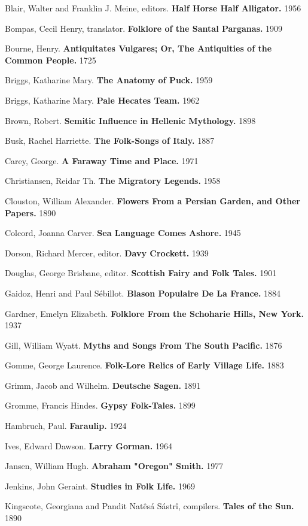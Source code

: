 \documentclass[14pt,a4paper]{memoir}
\begin{document}
Blair, Walter and Franklin J. Meine, editors. \textbf{Half Horse Half
Alligator.} 1956

Bompas, Cecil Henry, translator. \textbf{Folklore of the Santal
Parganas.} 1909

Bourne, Henry. \textbf{Antiquitates Vulgares; Or, The Antiquities of the
Common People.} 1725

Briggs, Katharine Mary. \textbf{The Anatomy of Puck.} 1959

Briggs, Katharine Mary. \textbf{Pale Hecate\textquotesingle s Team.}
1962

Brown, Robert. \textbf{Semitic Influence in Hellenic Mythology.} 1898

Busk, Rachel Harriette. \textbf{The Folk-Songs of Italy.} 1887

Carey, George. \textbf{A Faraway Time and Place.} 1971

Christiansen, Reidar Th. \textbf{The Migratory Legends.} 1958

Clouston, William Alexander. \textbf{Flowers From a Persian Garden, and
Other Papers.} 1890

Colcord, Joanna Carver. \textbf{Sea Language Comes Ashore.} 1945

Dorson, Richard Mercer, editor. \textbf{Davy Crockett.} 1939

Douglas, George Brisbane, editor. \textbf{Scottish Fairy and Folk
Tales.} 1901

Gaidoz, Henri and Paul Sébillot. \textbf{Blason Populaire De La France.}
1884

Gardner, Emelyn Elizabeth. \textbf{Folklore From the Schoharie Hills,
New York.} 1937

Gill, William Wyatt. \textbf{Myths and Songs From The South Pacific.}
1876

Gomme, George Laurence. \textbf{Folk-Lore Relics of Early Village Life.}
1883

Grimm, Jacob and Wilhelm. \textbf{Deutsche Sagen.} 1891

Gromme, Francis Hindes. \textbf{Gypsy Folk-Tales.} 1899

Hambruch, Paul. \textbf{Faraulip.} 1924

Ives, Edward Dawson. \textbf{Larry Gorman.} 1964

Jansen, William Hugh. \textbf{Abraham "Oregon" Smith.} 1977

Jenkins, John Geraint. \textbf{Studies in Folk Life.} 1969

Kingscote, Georgiana and Pandit Natêsá Sástrî, compilers. \textbf{Tales
of the Sun.} 1890
\end{document}
